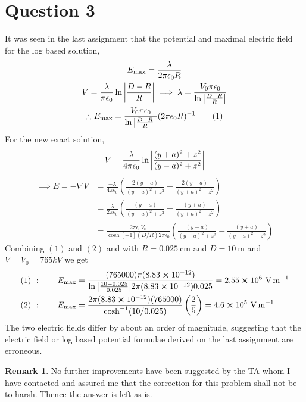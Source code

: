 \documentclass[
	12pt,
	]{article}
\newcommand{\ep}{\epsilon}
\theoremstyle{definition}
\theoremstyle{definition}
\theoremstyle{definition}
\theoremstyle{definition}
\theoremstyle{definition}
\theoremstyle{example}
\theoremstyle{note}
\newtheorem*{remark}{Remark}
\theoremstyle{remark}
\theoremstyle{example}
\begin{document}
		\section*{Question 3}
			It was seen in the last assignment that the potential and maximal electric field for the log based solution,
			\begin{gather*}
				E_{\text{max}} = \frac{\lambda}{2 \pi \epsilon_{0} R} \\
				V = \frac{\lambda}{\pi \epsilon_{0}} \ln\abs{\frac{D-R}{R}} \implies \lambda = \frac{V_{0} \pi \epsilon_{0}}{\ln \abs{\frac{D-R}{R}}} \\
				\therefore E_{\text{max}} = \frac{V_{0} \pi \epsilon_{0}}{\ln \abs{\frac{D-R}{R}}}(2 \pi \epsilon_{0}R)^{-1}\tag{1}
 			\end{gather*}
			For the new exact solution,
			$$V = \frac{\lambda}{4 \pi \epsilon_{0}} \ln \abs{\frac{(y+a)^{2} +z^{2}}{(y-a)^{2} +z^{2}}}$$
			\begin{align*}
				\implies E = -\nabla V &= \frac{- \lambda}{4 \pi \epsilon_{0}}\left( \frac{2(y-a)}{(y-a)^{2} + z^2} - \frac{2(y+a)}{(y+a)^{2} + z^2} \right) \\
				&= \frac{\lambda}{2 \pi \epsilon_{0}} \left( \frac{(y-a)}{(y-a)^{2} + z^2} - \frac{(y+a)}{(y+a)^{2} + z^2}\right) \\
				&= \frac{2\pi \ep_{0}V_{0}}{\cosh[-1](D/R) 2 \pi  \ep_{0}}\left( \frac{(y-a)}{(y-a)^{2} + z^2} - \frac{(y+a)}{(y+a)^{2} + z^2}\right)  \tag{2}
			\end{align*}
			Combining $(1)$ and $(2)$ and with $R = 0.025 \ \si{\centi\meter}$ and $D= 10 \ \si{\meter}$ and $V=V_{0} = 765 kV$ we get 
			\begin{align*}
				&(1) \ : \qquad  E_{\text{max}} = \frac{(765000) \pi (8.83\cross 10^{-12})}{\ln\abs{\frac{10- 0.025}{0.025}} 2 \pi (8.83\cross 10^{-12})0.025} = 2.55 \cross 10^{6} \ \si{\volt\per\meter} \\
				&(2) \ : \qquad E_{\text{max}} = \frac{2\pi (8.83\cross 10^{-12}) (765000)}{\cosh[-1](10/0.025)} \left(\frac{2}{5}\right) = 4.6 \cross 10^{5} \ \si{\volt\per\meter}
			\end{align*}
			The two electric fields differ by about an order of magnitude, suggesting that the electric field or log based potential formulae derived on the last assignment are erroneous. 
					\begin{remark}
						No further improvements have been suggested by the TA whom I have contacted and assured me that the correction for this problem shall not be to harsh. Thence the answer is left as is.
					\end{remark}
\end{document}
